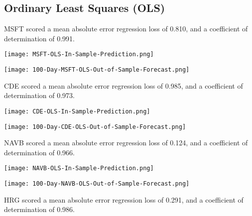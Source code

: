 \subsection{Ordinary Least Squares (OLS)}
MSFT scored a mean absolute error regression loss of 0.810, and a coefficient of determination of 0.991.

\begin{center}
    \texttt{[image: MSFT-OLS-In-Sample-Prediction.png]}
    \label{fig:nonfloat}
\end{center}

\begin{center}  
    \texttt{[image: 100-Day-MSFT-OLS-Out-of-Sample-Forecast.png]}
    \label{fig:nonfloat}
\end{center}

CDE scored a mean absolute error regression loss of 0.985, and a coefficient of determination of 0.973.

\begin{center}
    \texttt{[image: CDE-OLS-In-Sample-Prediction.png]}
    \label{fig:nonfloat}
\end{center}

\begin{center}
    \texttt{[image: 100-Day-CDE-OLS-Out-of-Sample-Forecast.png]}
    \label{fig:nonfloat}
\end{center}

NAVB scored a mean absolute error regression loss of 0.124, and a coefficient of determination of 0.966.

\begin{center}  
    \texttt{[image: NAVB-OLS-In-Sample-Prediction.png]}
    \label{fig:nonfloat}
\end{center}

\begin{center}
  
    \texttt{[image: 100-Day-NAVB-OLS-Out-of-Sample-Forecast.png]}
    \label{fig:nonfloat}
\end{center}

HRG scored a mean absolute error regression loss of 0.291, and a coefficient of determination of 0.986.

